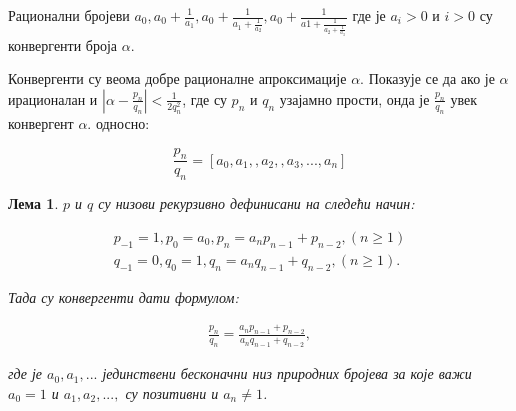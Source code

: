 \documentclass[a4paper]{article}
\newtheorem{lemma}{Лема}
\begin{document}
Рационални бројеви $ a_{0}, a_{0} + \frac{1}{a_{1}}, a_{0} + \frac{1}{a_{1} + \frac{1}{a_{2}}}, a_{0} + \frac{1}{a{1} + \frac{1}{a_{2} + \frac{1}{a_{3}}}} $ где је $ a_{i} > 0 $ и $ i > 0 $ су конвергенти броја $ \alpha $. 

Конвергенти су веома добре рационалне апроксимације $ \alpha $. Показује се да ако је $ \alpha $ ирационалан и $ |\alpha - \frac{p_{n}}{q_{n}}| < \frac{1}{2q_{n}^2} $, где су $ p_{n} $ и $ q_{n} $ узајамно прости, онда је $ \frac{p_{n}}{q_{n}} $ увек конвергент $ \alpha $. односно:

\begin{displaymath}
	\frac{p_{n}}{q_{n}} = [a_{0}, a_{1}, , a_{2}, , a_{3}, ..., a_{n}]
\end{displaymath}

\begin{lemma}
	\label{def:p_q_nizovi}
	$ p $ и $ q $ су низови рекурзивно дефинисани на следећи начин:
	
	\begin{eqnarray}
		p_{-1} = 1, p_{0} = a_{0}, p_{n} = a_{n}p_{n-1} + p_{n-2}, (n \geq 1 )\\
		q_{-1} = 0, q_{0} = 1, q_{n} = a_{n}q_{n-1} + q_{n-2}, (n \geq 1 ).
	\end{eqnarray}
	
	Тада су конвергенти дати формулом:
	
	\begin{eqnarray}
		\frac{p_{n}}{q_{n}} = \frac{a_{n}p_{n-1} + p_{n-2}}{a_{n}q_{n-1} + q_{n-2}},
	\end{eqnarray}
	
	где је $ a_{0}, a_{1}, ... $ јединствени бесконачни низ природних бројева за које важи $ a_{0} = 1 $ и $ a_{1}, a_{2}, ... ,  $ су позитивни и $ a_{n} \ne 1 $.
\end{lemma}
\end{document}
